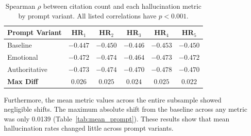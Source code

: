 \documentclass[11pt]{article}
\begin{document}
\setlength{\tabcolsep}{0.5pt}
\begin{table}[tb!]
  \centering
  \captionsetup{font=small}
  \footnotesize
  \begin{tabular}{@{}lccccc@{}}
    \toprule
    \textbf{Prompt Variant} & \textbf{HR$_1$} & \textbf{HR$_2$} & \textbf{HR$_3$} & \textbf{HR$_4$} & \textbf{HR$_5$} \\
    \midrule
    Baseline      & $-0.447$ & $-0.450$ & $-0.446$ & $-0.453$ & $-0.450$ \\
    Emotional     & $-0.472$ & $-0.474$ & $-0.464$ & $-0.473$ & $-0.472$ \\
    Authoritative & $-0.473$ & $-0.474$ & $-0.470$ & $-0.478$ & $-0.470$ \\
    \midrule
    \textbf{Max Diff} & $\mathbf{0.026}$ & $\mathbf{0.025}$ & $\mathbf{0.024}$ & $\mathbf{0.025}$ & $\mathbf{0.022}$ \\
    \bottomrule
  \end{tabular}
  \caption{Spearman $\rho$ between citation count and each hallucination metric by prompt variant. All listed correlations have $p < 0.001$.}
  \label{tab:spearman_prompt}
\end{table}

\setlength{\tabcolsep}{3pt}
\begin{table}[tb!]
  \centering
  \captionsetup{font=small}
  \footnotesize
  \caption{Paired bootstrap tests for prompt-variant Spearman differences. Each bootstrap sample resamples the same 1,004 papers across prompt variants, preserving the paired design. The $\Delta\rho$ values are estimated under this paired design and need not equal the difference of the marginal correlations reported in Table~\ref{tab:spearman_prompt}.}
  \label{tab:prompt_spearman_diffs}
\end{table}

Furthermore, the mean metric values across the entire subsample showed negligible shifts. The maximum absolute shift from the baseline across any metric was only 0.0139 (Table~\ref{tab:mean_prompt}). These results show that mean hallucination rates changed little across prompt variants.
\end{document}
